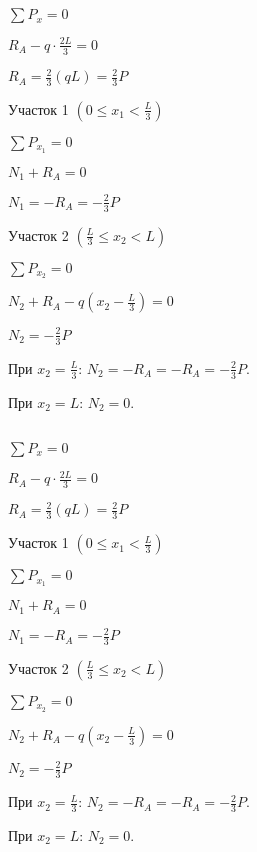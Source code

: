 \section{}

\subsection{}

$ \sum P_x = 0 $

$ R_A - q \cdot \frac{2L}{3} = 0 $

$ R_A = \frac{2}{3} \left(qL\right) = \frac{2}{3} P $

\vspace{1.5ex}

Участок 1 $ \left(0 \le x_1 < \frac{L}{3}\right) $

$ \sum P_{x_1} = 0 $

$ N_1 + R_A = 0 $

$ N_1 = -R_A = -\frac{2}{3} P $

\vspace{1.5ex}

Участок 2 $ \left(\frac{L}{3} \le x_2 < L\right) $

$ \sum P_{x_2} = 0 $

$ N_2 + R_A - q \left(x_2 - \frac{L}{3}\right) = 0 $

$ N_2 = -\frac{2}{3} P $

При $ x_2 = \frac{L}{3} $: $ N_2 = -R_A = -R_A = -\frac{2}{3} P $.

При $ x_2 = L $:           $ N_2 = 0 $.


\subsection{}

$ \sum P_x = 0 $

$ R_A - q \cdot \frac{2L}{3} = 0 $

$ R_A = \frac{2}{3} \left(qL\right) = \frac{2}{3} P $

\vspace{1.5ex}

Участок 1 $ \left(0 \le x_1 < \frac{L}{3}\right) $

$ \sum P_{x_1} = 0 $

$ N_1 + R_A = 0 $

$ N_1 = -R_A = -\frac{2}{3} P $

\vspace{1.5ex}

Участок 2 $ \left(\frac{L}{3} \le x_2 < L\right) $

$ \sum P_{x_2} = 0 $

$ N_2 + R_A - q \left(x_2 - \frac{L}{3}\right) = 0 $

$ N_2 = -\frac{2}{3} P $

При $ x_2 = \frac{L}{3} $: $ N_2 = -R_A = -R_A = -\frac{2}{3} P $.

При $ x_2 = L $:           $ N_2 = 0 $.
